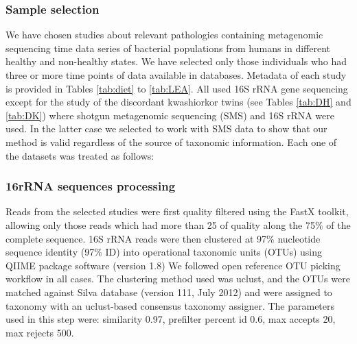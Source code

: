\subsubsection*{Sample selection}
We have chosen studies about relevant pathologies containing metagenomic sequencing time data series of bacterial populations from humans in different healthy and non-healthy states. We have selected only those individuals who had three or more time points of data available in databases. Metadata of each study is provided in Tables \ref{tab:diet} to \ref{tab:LEA}. All used 16S rRNA gene sequencing except for the study of the discordant kwashiorkor twins\cite{kwashiorkor} (see Tables \ref{tab:DH} and \ref{tab:DK}) where shotgun metagenomic sequencing (SMS) and 16S rRNA were used. In the latter case we selected to work with SMS data to show that our method is valid regardless of the source of taxonomic information. Each one of the datasets was treated as follows:

\subsubsection*{16rRNA sequences processing}
Reads from the selected studies were first quality filtered using the FastX toolkit\cite{FASTX}, allowing only those reads which had more than 25 of quality along the 75\% of the complete sequence. 16S rRNA reads were then clustered at 97\% nucleotide sequence identity (97\% ID) into operational taxonomic units (OTUs) using QIIME package software\cite{QIIME} (version 1.8) We followed open reference OTU picking workflow in all cases. The clustering method used was uclust, and the OTUs were matched against Silva database\cite{SILVA} (version 111, July 2012) and were assigned to taxonomy with an uclust-based consensus taxonomy assigner. The parameters used in this step were: similarity 0.97, prefilter percent id 0.6, max accepts 20, max rejects 500. 

